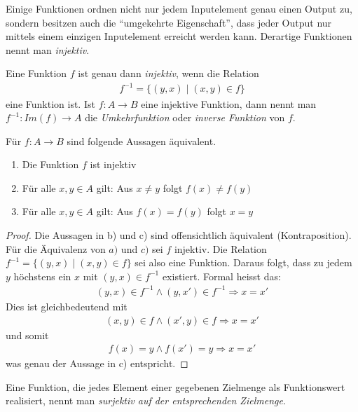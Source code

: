 Einige Funktionen ordnen nicht nur jedem Inputelement genau einen Output zu, sondern besitzen auch die ``umgekehrte Eigenschaft'', dass jeder Output nur mittels einem einzigen Inputelement erreicht werden kann. Derartige Funktionen nennt man \textit{injektiv}.

\begin{df}
    Eine Funktion $f$ ist genau dann \textit{injektiv}, wenn die Relation
    \begin{align*}
        f^{-1}=\{(y,x)\mid (x,y)\in f\}
    \end{align*}
    eine Funktion ist. Ist $f:A\to B$ eine injektive Funktion, dann nennt man $f^{-1}:Im(f)\to A$ die \textit{Umkehrfunktion} oder \textit{inverse Funktion} von $f$.
\end{df}


\begin{rk}
    Für $f:A \to B$ sind folgende Aussagen äquivalent.
    \begin{enumerate}
        \item Die Funktion $f$ ist injektiv
        \item Für alle $x,y\in A$ gilt: Aus $x\neq y$ folgt $f(x)\neq f(y)$
        \item Für alle $x,y\in A$ gilt: Aus $f(x)=f(y)$ folgt $x=y$
    \end{enumerate}
\end{rk}
\begin{proof}
    Die Aussagen in b) und c) sind offensichtlich äquivalent (Kontraposition). Für die Äquivalenz von $a)$ und $c)$ sei $f$ injektiv. Die Relation $f^{-1}=\{(y,x)\mid (x,y)\in f\}$ sei also eine Funktion. Daraus folgt, dass zu jedem $y$ höchstens ein $x$ mit $(y,x)\in f^{-1}$ existiert. Formal heisst das:
    \begin{align*}
        (y,x)\in f^{-1}\land (y,x')\in f^{-1}\Rightarrow x=x'
    \end{align*}
    Dies ist gleichbedeutend mit
    \begin{align*}
        (x,y)\in f\land (x',y)\in f\Rightarrow x=x'
    \end{align*}
    und somit
    \begin{align*}
        f(x)=y\land f(x')=y\Rightarrow x=x'
    \end{align*}
    was genau der Aussage in c) entspricht.
\end{proof}


Eine Funktion, die jedes Element einer gegebenen Zielmenge als Funktionswert realisiert, nennt man \textit{surjektiv auf der entsprechenden Zielmenge}.

